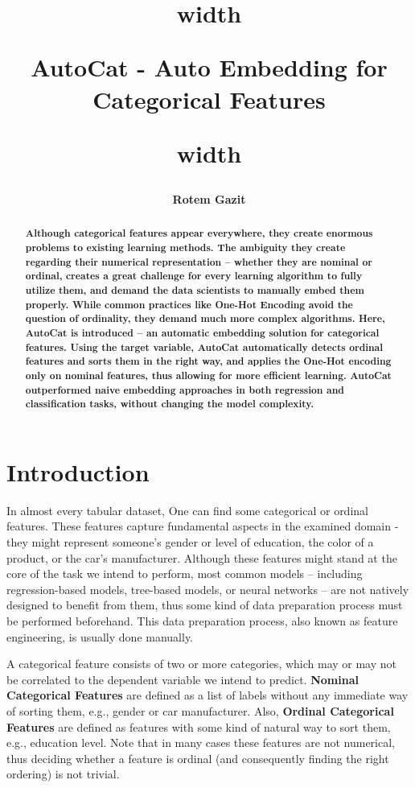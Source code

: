 \documentclass{article}
\title{
\noindent\vrule height 2.5pt width \textwidth
\begin{center}
    \bfseries AutoCat - Auto Embedding for Categorical Features
\end{center}
\noindent\vrule height 2.5pt width \textwidth
}
\author{\bfseries Rotem Gazit}
\date{}
\begin{document}
\maketitle


\begin{abstract}
\bfseries
Although categorical features appear everywhere, they create enormous problems to existing learning methods. The ambiguity they create regarding their numerical representation -- whether they are nominal or ordinal, creates a great challenge for every learning algorithm to fully utilize them, and demand the data scientists to manually embed them properly. While common practices like One-Hot Encoding avoid the question of ordinality, they demand much more complex algorithms. Here, AutoCat is introduced -- an automatic embedding solution for categorical features. Using the target variable, AutoCat automatically detects ordinal features and sorts them in the right way, and applies the One-Hot encoding only on nominal features, thus allowing for more efficient learning. AutoCat outperformed naive embedding approaches in both regression and classification tasks, without changing the model complexity.
\end{abstract}

\section{Introduction}
In almost every tabular dataset, One can find some categorical or ordinal features. These features capture fundamental aspects in the examined domain - they might represent someone’s gender or level of education, the color of a product, or the car’s manufacturer. Although these features might stand at the core of the task we intend to perform, most common models – including regression-based models, tree-based models, or neural networks – are not natively designed to benefit from them, thus some kind of data preparation process must be performed beforehand. This data preparation process, also known as feature engineering, is usually done manually.

A categorical feature consists of two or more categories, which may or may not be correlated to the dependent variable we intend to predict. \textbf{Nominal Categorical Features} are defined as a list of labels without any immediate way of sorting them, e.g., gender or car manufacturer. Also, \textbf{Ordinal Categorical Features} are defined as features with some kind of natural way to sort them, e.g., education level. Note that in many cases these features are not numerical, thus deciding whether a feature is ordinal (and consequently finding the right ordering) is not trivial.
\end{document}
